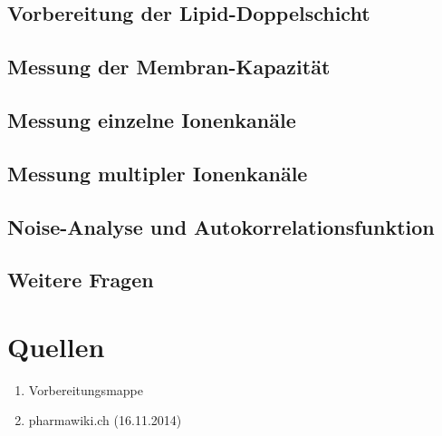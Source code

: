 \documentclass[a4paper,ngerman]{scrartcl}
\begin{document}
\subsection{Vorbereitung der Lipid-Doppelschicht}
\label{sec:bilayer-vorbereitung}

\subsection{Messung der Membran-Kapazität}
\label{sec:capacity}

\subsection{Messung einzelne Ionenkanäle}
\label{sec:singlechannels}

\subsection{Messung multipler Ionenkanäle}
\label{sec:multiplechannels}


\subsection{Noise-Analyse und Autokorrelationsfunktion}
\label{sec:noise-autocorr}

\subsection{Weitere Fragen}
\label{sec:weitere-fragen}















\section{Quellen}
\begin{enumerate}
\item Vorbereitungsmappe \label{ref:mappe}
\item pharmawiki.ch (16.11.2014) \label{ref:pharmawiki}
\end{enumerate}
\end{document}
